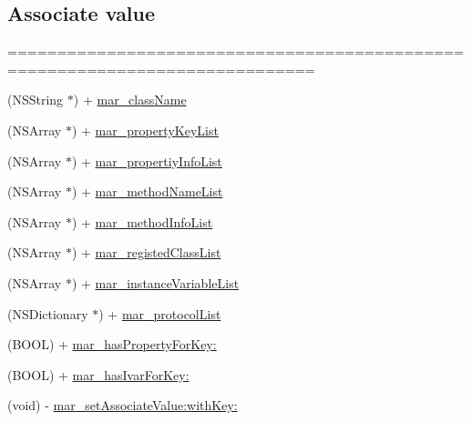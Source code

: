 \subsection*{Associate value}
\label{_amgrp5d08257c2c9e2c6d46d125ad3a484daa}%
============================================================================= 

 \begin{DoxyCompactItemize}
\item 
(N\+S\+String $\ast$) + \hyperlink{category_n_s_object_07_m_a_r_e_x___r_u_n_t_i_m_e_08_a3058226e5449755cc7d226b7951dba25}{mar\+\_\+class\+Name}
\item 
(N\+S\+Array $\ast$) + \hyperlink{category_n_s_object_07_m_a_r_e_x___r_u_n_t_i_m_e_08_a612b9bf6d1fd93ed4fe8198d34e884d3}{mar\+\_\+property\+Key\+List}
\item 
(N\+S\+Array $\ast$) + \hyperlink{category_n_s_object_07_m_a_r_e_x___r_u_n_t_i_m_e_08_a3cb8fb46872bb4d061f288e1e57cd3bf}{mar\+\_\+propertiy\+Info\+List}
\item 
(N\+S\+Array $\ast$) + \hyperlink{category_n_s_object_07_m_a_r_e_x___r_u_n_t_i_m_e_08_aaff070293035f7d9f08ac2d8f308ba2e}{mar\+\_\+method\+Name\+List}
\item 
(N\+S\+Array $\ast$) + \hyperlink{category_n_s_object_07_m_a_r_e_x___r_u_n_t_i_m_e_08_a3a8102e3d25daca038e9cf0b19b5e5c9}{mar\+\_\+method\+Info\+List}
\item 
(N\+S\+Array $\ast$) + \hyperlink{category_n_s_object_07_m_a_r_e_x___r_u_n_t_i_m_e_08_a0e37c92d9c49d7ec04e64b0bf9b18faf}{mar\+\_\+registed\+Class\+List}
\item 
(N\+S\+Array $\ast$) + \hyperlink{category_n_s_object_07_m_a_r_e_x___r_u_n_t_i_m_e_08_a02960ffd381bbfc1fdd0f63c8fe75cfb}{mar\+\_\+instance\+Variable\+List}
\item 
(N\+S\+Dictionary $\ast$) + \hyperlink{category_n_s_object_07_m_a_r_e_x___r_u_n_t_i_m_e_08_a17909e9ae80ee3a66778e8aeeaccec75}{mar\+\_\+protocol\+List}
\item 
(B\+O\+OL) + \hyperlink{category_n_s_object_07_m_a_r_e_x___r_u_n_t_i_m_e_08_ae62fe0aa26dfd39d671f119a7a6594d9}{mar\+\_\+has\+Property\+For\+Key\+:}
\item 
(B\+O\+OL) + \hyperlink{category_n_s_object_07_m_a_r_e_x___r_u_n_t_i_m_e_08_a92cd786e4ff67ef7b1921bbc7cfe7e30}{mar\+\_\+has\+Ivar\+For\+Key\+:}
\item 
(void) -\/ \hyperlink{category_n_s_object_07_m_a_r_e_x___r_u_n_t_i_m_e_08_aeaebaf0bb18d34e8c804e5d92620cc6a}{mar\+\_\+set\+Associate\+Value\+:with\+Key\+:}
\item 

\end{DoxyCompactItemize}
